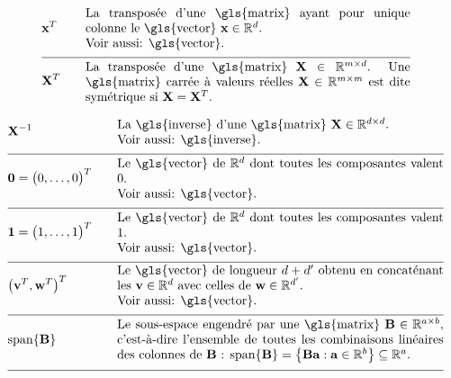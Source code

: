 \begin{align}
	&\featurevec^{T} &\quad & \parbox{.75\textwidth}{La transposée d’une \gls{matrix} ayant pour unique colonne le \gls{vector} $\featurevec \in \mathbb{R}^{\dimlocalmodel}$.
		\\ Voir aussi: \gls{vector}.} \nonumber \\[2mm] \hline \nonumber\\[-5mm]
	&\mathbf{X}^{T} &\quad & \parbox{.75\textwidth}{La transposée d’une \gls{matrix} $\mathbf{X} \in \mathbb{R}^{\samplesize \times \featuredim}$. Une \gls{matrix} carrée à valeurs réelles $\mathbf{X} \in \mathbb{R}^{\samplesize \times \samplesize}$ est dite symétrique si $\mathbf{X} = \mathbf{X}^{T}$.}  \nonumber 
\end{align}

\newpage
\begin{align} 
	&\mathbf{X}^{-1} &\quad & \parbox{.75\textwidth}{La \gls{inverse} d'une \gls{matrix} $\mathbf{X} \in \mathbb{R}^{\featuredim \times \featuredim}$.
		\\ Voir aussi: \gls{inverse}. } \nonumber \\[2mm] \hline \nonumber\\[-5mm]
	&\mathbf{0}= \big(0,\ldots,0\big)^{T}  & \quad &  \parbox{.75\textwidth}{Le \gls{vector} de $\mathbb{R}^{\dimlocalmodel}$ dont toutes les composantes valent 0.
		\\ Voir aussi: \gls{vector}.} \nonumber \\[2mm] \hline \nonumber\\[-5mm]
	&\mathbf{1}= \big(1,\ldots,1\big)^{T}  & \quad &  \parbox{.75\textwidth}{Le \gls{vector} de $\mathbb{R}^{\dimlocalmodel}$ dont toutes les composantes valent 1.
		\\ Voir aussi: \gls{vector}.} \nonumber \\[2mm] \hline \nonumber\\[-5mm]
	&\big(\vv^{T},\vw^{T} \big)^{T}  & \quad &  \parbox{.75\textwidth}{Le \gls{vector} de longueur $\featuredim+\featuredim'$ obtenu en concaténant les $\vv \in \mathbb{R}^{\featuredim}$ avec celles de $\vw \in \mathbb{R}^{\featuredim'}$.
		\\ Voir aussi: \gls{vector}.} \nonumber \\[2mm] \hline \nonumber\\[-5mm]
	&	{\rm span}\{ \mathbf{B} \}  & \quad &  \parbox{.75\textwidth}{Le sous-espace engendré par une \gls{matrix} $\mathbf{B} \in \mathbb{R}^{a \times b}$, c’est-à-dire l’ensemble de toutes les combinaisons linéaires des colonnes de $\mathbf{B}$ : ${\rm span}\{ \mathbf{B} \} = \big\{  \mathbf{B} \va : \va \in \mathbb{R}^{b} \big\} \subseteq \mathbb{R}^{a}$.} \nonumber \\[2mm] \hline \nonumber\\[-5mm]

\end{align}
